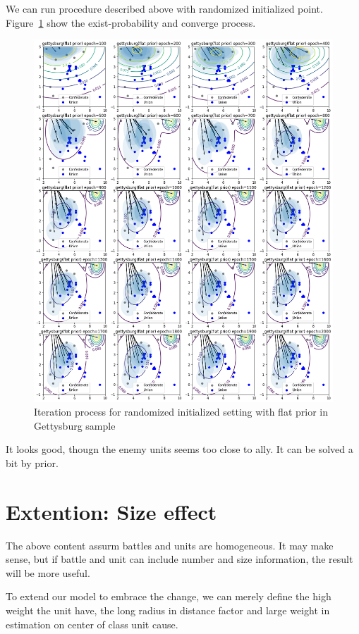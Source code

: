 \documentclass{article}
\begin{document}
We can run procedure described above with randomized initialized point. 
Figure~\ref{fig:gettysburgInit} show the exist-probability and converge process.

\begin{figure}[h]
\includegraphics[width=0.99\linewidth]{gettysburg-init.png}
\caption{Iteration process for randomized initialized setting with flat prior in Gettysburg sample}
\label{fig:gettysburgInit}
\end{figure}

It looks good, thougn the enemy units seems too close to ally. It can be solved a bit by prior.


\section{Extention: Size effect}

The above content assurm battles and units are homogeneous. It may make sense,
but if battle and unit can include number and size information, the result will be more useful.

To extend our model to embrace the change, we can merely define the high weight the unit have,
the long radius in distance factor and large weight in estimation on center of class unit cause.
\end{document}
